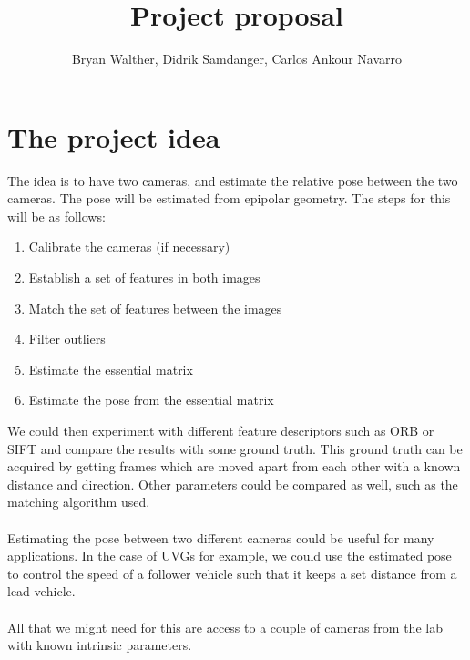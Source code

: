 \documentclass[12pt]{article}
\title{Project proposal}
\author{Bryan Walther, Didrik Samdanger, Carlos Ankour Navarro}
\begin{document}
\maketitle
\section*{The project idea}
The idea is to have two cameras, and estimate the relative pose between the two cameras.
The pose will be estimated from epipolar geometry. The steps for this will be as follows:
\begin{enumerate}
    \item Calibrate the cameras (if necessary)
    \item Establish a set of features in both images
    \item Match the set of features between the images
    \item Filter outliers
    \item Estimate the essential matrix
    \item Estimate the pose from the essential matrix
\end{enumerate}

We could then experiment with different feature descriptors such as ORB or SIFT and compare the results with some ground truth.
This ground truth can be acquired by getting frames which are moved apart from each other with a known distance and direction.
Other parameters could be compared as well, such as the matching algorithm used.
\\ \\
Estimating the pose between two different cameras could be useful for many applications. 
In the case of UVGs for example, we could use the estimated pose to control the speed of a follower vehicle such that it keeps a set distance from a lead vehicle.
\\ \\
All that we might need for this are access to a couple of cameras from the lab with known intrinsic parameters.
\end{document}
